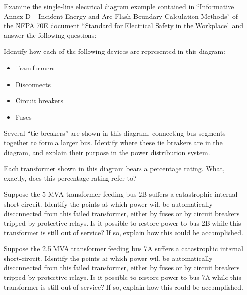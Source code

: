 

Examine the single-line electrical diagram example contained in ``Informative Annex D -- Incident Energy and Arc Flash Boundary Calculation Methods'' of the NFPA 70E document ``Standard for Electrical Safety in the Workplace'' and answer the following questions:

\vskip 10pt

Identify how each of the following devices are represented in this diagram:

\begin{itemize}
\item{} Transformers
\item{} Disconnects
\item{} Circuit breakers
\item{} Fuses
\end{itemize}

\vskip 10pt

Several ``tie breakers'' are shown in this diagram, connecting bus segments together to form a larger bus.  Identify where these tie breakers are in the diagram, and explain their purpose in the power distribution system.

\vskip 10pt

Each transformer shown in this diagram bears a percentage rating.  What, exactly, does this percentage rating refer to?

\vskip 10pt

Suppose the 5 MVA transformer feeding bus 2B suffers a catastrophic internal short-circuit.  Identify the points at which power will be automatically disconnected from this failed transformer, either by fuses or by circuit breakers tripped by protective relays.  Is it possible to restore power to bus 2B while this transformer is still out of service?  If so, explain how this could be accomplished.

\vskip 10pt

Suppose the 2.5 MVA transformer feeding bus 7A suffers a catastrophic internal short-circuit.  Identify the points at which power will be automatically disconnected from this failed transformer, either by fuses or by circuit breakers tripped by protective relays.  Is it possible to restore power to bus 7A while this transformer is still out of service?  If so, explain how this could be accomplished.

